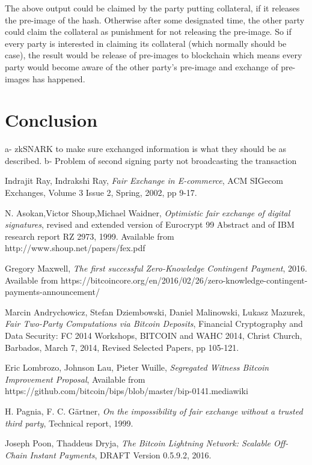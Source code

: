\documentclass[]{article}
\begin{document}
The above output could be claimed by the party putting collateral, if it releases the pre-image of the hash. Otherwise after some designated time, the other party could claim the collateral as punishment for not releasing the pre-image. So if every party is interested in claiming its collateral (which normally should be case), the result would be release of pre-images to blockchain which means every party would become aware of the other party's pre-image and exchange of pre-images has happened.

\section{Conclusion}
a- zkSNARK to make sure exchanged information is what they should be as described.
b- Problem of second signing party not broadcasting the transaction


\begin{thebibliography}{9}
	Indrajit Ray, Indrakshi Ray, 
	\textit{Fair Exchange in E-commerce},
	ACM SIGecom Exchanges, Volume 3 Issue 2, Spring, 2002,
	pp 9-17. 
	
	    N. Asokan,Victor Shoup,Michael Waidner,
	    \textit{Optimistic fair exchange of digital signatures},
	    revised and extended version of Eurocrypt 99 Abstract and of IBM research report RZ 2973, 1999. Available from http://www.shoup.net/papers/fex.pdf
		
	Gregory Maxwell,
	\textit{The first successful Zero-Knowledge Contingent Payment}, 2016.
	Available from https://bitcoincore.org/en/2016/02/26/zero-knowledge-contingent-payments-announcement/
	
	Marcin Andrychowicz, Stefan Dziembowski, Daniel Malinowski, Lukasz Mazurek,
	\textit{Fair Two-Party Computations via Bitcoin Deposits}, Financial Cryptography and Data Security: FC 2014 Workshops, BITCOIN and WAHC 2014, Christ Church, Barbados, March 7, 2014, Revised Selected Papers, pp 105-121.
	
	Eric Lombrozo, Johnson Lau, Pieter Wuille,
	\textit{Segregated Witness Bitcoin Improvement Proposal},
	Available from https://github.com/bitcoin/bips/blob/master/bip-0141.mediawiki
	
	H. Pagnia, F. C. Gärtner, 
	\textit{On the impossibility of fair exchange without a trusted
	third party}, Technical report, 1999.

	Joseph Poon, Thaddeus Dryja,
	\textit{The Bitcoin Lightning Network: Scalable Off-Chain Instant Payments}, DRAFT Version 0.5.9.2, 2016.
	    
\end{thebibliography}
\end{document}
